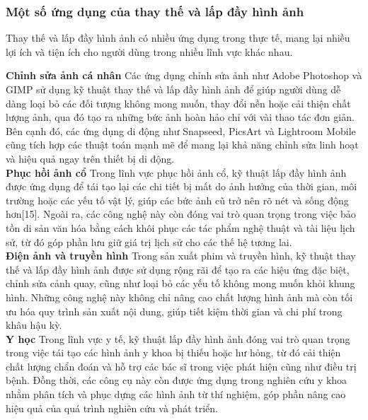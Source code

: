 \documentclass[12pt]{report}
\begin{document}
\subsubsection{Một số ứng dụng của thay thế và lấp đầy hình ảnh}

Thay thế và lấp đầy hình ảnh có nhiều ứng dụng trong thực tế, mang lại nhiều lợi ích và tiện ích cho người dùng trong nhiều lĩnh vực khác nhau.

\textbf{Chỉnh sửa ảnh cá nhân}
Các ứng dụng chỉnh sửa ảnh như Adobe Photoshop và GIMP sử dụng kỹ thuật thay thế và lấp đầy hình ảnh để giúp người dùng dễ dàng loại bỏ các đối tượng không mong muốn, thay đổi nền hoặc cải thiện chất lượng ảnh, qua đó tạo ra những bức ảnh hoàn hảo chỉ với vài thao tác đơn giản. Bên cạnh đó, các ứng dụng di động như Snapseed, PicsArt và Lightroom Mobile cũng tích hợp các thuật toán mạnh mẽ để mang lại khả năng chỉnh sửa linh hoạt và hiệu quả ngay trên thiết bị di động.\\

\textbf{Phục hồi ảnh cổ}
Trong lĩnh vực phục hồi ảnh cổ, kỹ thuật lấp đầy hình ảnh được ứng dụng để tái tạo lại các chi tiết bị mất do ảnh hưởng của thời gian, môi trường hoặc các yếu tố vật lý, giúp các bức ảnh cũ trở nên rõ nét và sống động hơn[15]. Ngoài ra, các công nghệ này còn đóng vai trò quan trọng trong việc bảo tồn di sản văn hóa bằng cách khôi phục các tác phẩm nghệ thuật và tài liệu lịch sử, từ đó góp phần lưu giữ giá trị lịch sử cho các thế hệ tương lai.\\

\textbf{Điện ảnh và truyền hình}
Trong sản xuất phim và truyền hình, kỹ thuật thay thế và lấp đầy hình ảnh được sử dụng rộng rãi để tạo ra các hiệu ứng đặc biệt, chỉnh sửa cảnh quay, cũng như loại bỏ các yếu tố không mong muốn khỏi khung hình. Những công nghệ này không chỉ nâng cao chất lượng hình ảnh mà còn tối ưu hóa quy trình sản xuất nội dung, giúp tiết kiệm thời gian và chi phí trong khâu hậu kỳ.\\

\textbf{Y học}
Trong lĩnh vực y tế, kỹ thuật lấp đầy hình ảnh đóng vai trò quan trọng trong việc tái tạo các hình ảnh y khoa bị thiếu hoặc hư hỏng, từ đó cải thiện chất lượng chẩn đoán và hỗ trợ các bác sĩ trong việc phát hiện cũng như điều trị bệnh. Đồng thời, các công cụ này còn được ứng dụng trong nghiên cứu y khoa nhằm phân tích và phục dựng các hình ảnh từ thí nghiệm, góp phần nâng cao hiệu quả của quá trình nghiên cứu và phát triển.\\
\end{document}
